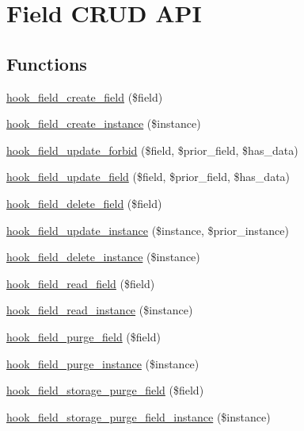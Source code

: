 \hypertarget{group__field__crud}{
\section{Field CRUD API}
\label{group__field__crud}
}
\subsection*{Functions}
\begin{DoxyCompactItemize}
\item 
\hyperlink{group__field__crud_ga925648157864b55f553f5d2d31e2bf1b}{hook\_\-field\_\-create\_\-field} (\$field)
\item 
\hyperlink{group__field__crud_ga199cb6235866c98ab74a6680bb00b17a}{hook\_\-field\_\-create\_\-instance} (\$instance)
\item 
\hyperlink{group__field__crud_ga7bd0ccd40a9a3690b697b68d03f660a4}{hook\_\-field\_\-update\_\-forbid} (\$field, \$prior\_\-field, \$has\_\-data)
\item 
\hyperlink{group__field__crud_ga4f06c14e6fb60ec1903c005ddbb4ee83}{hook\_\-field\_\-update\_\-field} (\$field, \$prior\_\-field, \$has\_\-data)
\item 
\hyperlink{group__field__crud_gacc586bd79943816012827d165b668aab}{hook\_\-field\_\-delete\_\-field} (\$field)
\item 
\hyperlink{group__field__crud_gadac9cbd13f55714dbf8fc2a98227f6e3}{hook\_\-field\_\-update\_\-instance} (\$instance, \$prior\_\-instance)
\item 
\hyperlink{group__field__crud_gae351ac9408b7c2e8bfefd9ebca5ab7f5}{hook\_\-field\_\-delete\_\-instance} (\$instance)
\item 
\hyperlink{group__field__crud_gaef26e203f796171adad2a4d3ffa9eb3f}{hook\_\-field\_\-read\_\-field} (\$field)
\item 
\hyperlink{group__field__crud_gaf3812ab3837b9b2757dd3d7a1dfb2153}{hook\_\-field\_\-read\_\-instance} (\$instance)
\item 
\hyperlink{group__field__crud_ga3ffd215689e7cb41bcf9b79f8a65eab0}{hook\_\-field\_\-purge\_\-field} (\$field)
\item 
\hyperlink{group__field__crud_gaefbe3afc4ad006fb3566204930f0e186}{hook\_\-field\_\-purge\_\-instance} (\$instance)
\item 
\hyperlink{group__field__crud_gaf58b7071fdeee08fb4edadc127eecd5d}{hook\_\-field\_\-storage\_\-purge\_\-field} (\$field)
\item 
\hyperlink{group__field__crud_ga9634594ee1edc36db59d2e87abfaf193}{hook\_\-field\_\-storage\_\-purge\_\-field\_\-instance} (\$instance)

\end{DoxyCompactItemize}
